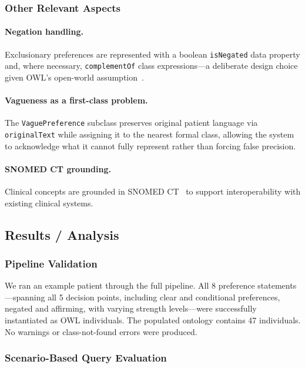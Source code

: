 \documentclass[11pt]{article}
\newcommand{\onto}[1]{\texttt{#1}}
\begin{document}
\subsubsection{Other Relevant Aspects}

\paragraph{Negation handling.}
Exclusionary preferences are represented with a boolean \onto{isNegated} data property and, where necessary, \onto{complementOf} class expressions---a deliberate design choice given OWL's open-world assumption~\cite{owl2primer}.

\paragraph{Vagueness as a first-class problem.}
The \onto{VaguePreference} subclass preserves original patient language via \onto{originalText} while assigning it to the nearest formal class, allowing the system to acknowledge what it cannot fully represent rather than forcing false precision.

\paragraph{SNOMED CT grounding.}
Clinical concepts are grounded in SNOMED CT~\cite{snomedct} to support interoperability with existing clinical systems.

\subsection{Results / Analysis}

\subsubsection{Pipeline Validation}

We ran an example patient through the full pipeline. All 8 preference statements---spanning all 5 decision points, including clear and conditional preferences, negated and affirming, with varying strength levels---were successfully instantiated as OWL individuals. The populated ontology contains 47 individuals. No warnings or class-not-found errors were produced.

\subsubsection{Scenario-Based Query Evaluation}
\end{document}
